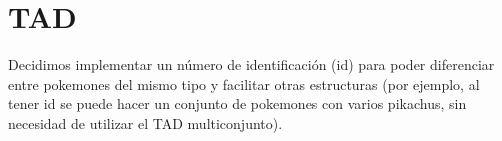 \section{TAD }

Decidimos implementar un número de identificación (id) para poder diferenciar entre pokemones del mismo tipo y facilitar otras estructuras (por ejemplo, al tener id se puede hacer un conjunto de pokemones con varios pikachus, sin necesidad de utilizar el TAD multiconjunto).

\begin{tad}{}


\tadObservadores
{}


\tadGeneradores
{}



\end{tad}
